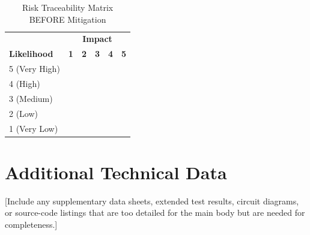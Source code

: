 \documentclass[12pt, a4paper]{report}
\begin{document}
\begin{appendices}
\begin{table}[H]
    \centering
    \caption{Risk Traceability Matrix BEFORE Mitigation}
    \label{tab:risk-before}
    \begin{tabular}{@{} l ccccc @{}}
        \toprule
         & \multicolumn{5}{c}{\textbf{Impact}} \\
        \textbf{Likelihood} & \textbf{1} & \textbf{2} & \textbf{3} & \textbf{4} & \textbf{5} \\
        \midrule
        5 (Very High) & & & & & \\
        4 (High)      & & & & & \\
        3 (Medium)    & & & & & \\
        2 (Low)       & & & & & \\
        1 (Very Low)  & & & & & \\
        \bottomrule
    \end{tabular}
\end{table}

\chapter{Additional Technical Data}
\label{app:technical}

[Include any supplementary data sheets, extended test results,
circuit diagrams, or source-code listings that are too detailed
for the main body but are needed for completeness.]

\end{appendices}

\end{document}
